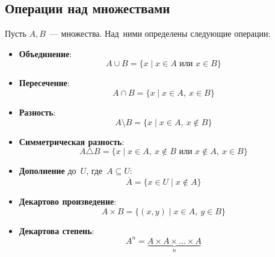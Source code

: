 \subsection{Операции над множествами}
Пусть $A, B$~--- множества. Над~ними определены следующие операции:
\begin{itemize}
	\item \textbf{Объединение}:
	\begin{equation*}
	A \cup B = \{ x \mid x \in A \text{ или } x \in B \}
	\end{equation*}
	\item \textbf{Пересечение}:
	\begin{equation*}
	A \cap B = \{ x \mid x \in A, \ x \in B \}
	\end{equation*}
	\item \textbf{Разность}:
	\begin{equation*}
	A \setminus B = \{ x \mid x \in A, \ x \notin B \}
	\end{equation*}
	\item \textbf{Симметрическая разность}:
	\begin{equation*}
	A \triangle B = \{ x \mid x \in A, \ x \notin B \text{ или } x \notin A, \ x \in B \}
	\end{equation*}
	\item \textbf{Дополнение} до~$U$, где~$A \subseteq U$:
	\begin{equation*}
	\overline A = \{ x \in U \mid x \notin A \}
	\end{equation*}
	\item \textbf{Декартово произведение}:
	\begin{equation*}
	A \times B = \{ (x, y) \mid x \in A, \ y \in B \}
	\end{equation*}
	\item \textbf{Декартова степень}:
	\begin{equation*}
	A^n = \underbrace{A \times A \times \ldots \times A}_n
	\end{equation*}
\end{itemize}